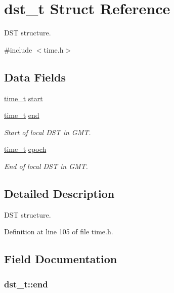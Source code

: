 \hypertarget{structdst__t}{}\section{dst\+\_\+t Struct Reference}
\label{structdst__t}


D\+ST structure.  




{\ttfamily \#include $<$time.\+h$>$}

\subsection*{Data Fields}
\begin{DoxyCompactItemize}
\item 
\hyperlink{time_8h_a3346b04b0420b32ccf6b706551b70762}{time\+\_\+t} \hyperlink{structdst__t_af1868fb321db3637664e3a3bf11cf56b}{start}
\item 
\hyperlink{time_8h_a3346b04b0420b32ccf6b706551b70762}{time\+\_\+t} \hyperlink{structdst__t_a9a6e1d16a7057ad1206b9230b073f99f}{end}
\begin{DoxyCompactList}\small\item\em Start of local D\+ST in G\+MT. \end{DoxyCompactList}\item 
\hyperlink{time_8h_a3346b04b0420b32ccf6b706551b70762}{time\+\_\+t} \hyperlink{structdst__t_ae8b931e1a2731b688e1af1253787827c}{epoch}
\begin{DoxyCompactList}\small\item\em End of local D\+ST in G\+MT. \end{DoxyCompactList}\end{DoxyCompactItemize}


\subsection{Detailed Description}
D\+ST structure. 

Definition at line 105 of file time.\+h.



\subsection{Field Documentation}
\subsubsection[{\texorpdfstring{end}{end}}]{ dst\+\_\+t\+::end}\hypertarget{structdst__t_a9a6e1d16a7057ad1206b9230b073f99f}{}\label{structdst__t_a9a6e1d16a7057ad1206b9230b073f99f}


